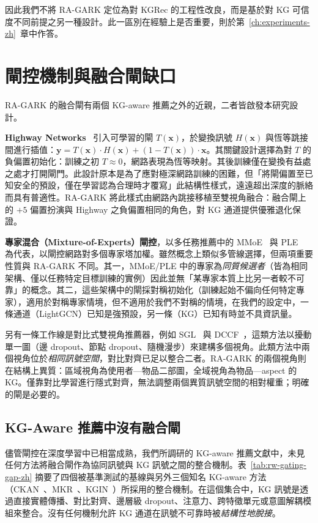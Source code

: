 因此我們不將 RA-GARK 定位為對 KGRec 的工程性改良，而是基於對 KG 可信度不同前提之另一種設計。此一區別在經驗上是否重要，則於第~\ref{ch:experiments-zh}~章中作答。

\section{閘控機制與融合閘缺口}
\label{sec:rw-gating-zh}

RA-GARK 的融合閘有兩個 KG-aware 推薦之外的近親，二者皆啟發本研究設計。

\textbf{Highway Networks}~\cite{srivastava2015highway} 引入可學習的閘 $T(\mathbf{x})$，於變換訊號 $H(\mathbf{x})$ 與恆等跳接間進行插值：$\mathbf{y} = T(\mathbf{x}) \cdot H(\mathbf{x}) + (1 - T(\mathbf{x})) \cdot \mathbf{x}$。其關鍵設計選擇為對 $T$ 的負偏置初始化：訓練之初 $T \approx 0$，網路表現為恆等映射。其後訓練僅在變換有益處之處才打開閘門。此設計原本是為了應對極深網路訓練的困難，但「將閘偏置至已知安全的預設，僅在學習認為合理時才覆寫」此結構性樣式，遠遠超出深度的脈絡而具有普適性。RA-GARK 將此樣式由網路內跳接移植至雙視角融合：融合閘上的 $+5$ 偏置扮演與 Highway 之負偏置相同的角色，對 KG 通道提供優雅退化保證。

\textbf{專家混合（Mixture-of-Experts）閘控}，以多任務推薦中的 MMoE~\cite{ma2018mmoe} 與 PLE~\cite{tang2020ple} 為代表，以閘控網路對多個專家塔加權。雖然概念上類似多管線選擇，但兩項重要性質與 RA-GARK 不同。其一，MMoE/PLE 中的專家為\emph{同質候選者}（皆為相同架構、僅以任務特定目標訓練的實例）因此並無「某專家本質上比另一者較不可靠」的概念。其二，這些架構中的閘採對稱初始化（訓練起始不偏向任何特定專家），適用於對稱專家情境，但不適用於我們不對稱的情境，在我們的設定中，一條通道（LightGCN）已知是強預設，另一條（KG）已知有時並不具資訊量。

另有一條工作線是對比式雙視角推薦器，例如 SGL~\cite{wu2021sgl} 與 DCCF~\cite{ren2023dccf}，這類方法以擾動單一圖（邊 dropout、節點 dropout、隨機漫步）來建構多個視角。此類方法中兩個視角位於\emph{相同訊號空間}，對比對齊已足以整合二者。RA-GARK 的兩個視角則在結構上異質：區域視角為使用者—物品二部圖，全域視角為物品—aspect 的 KG。僅靠對比學習進行隱式對齊，無法調整兩個異質訊號空間的相對權重；明確的閘是必要的。

\subsection{KG-Aware 推薦中沒有融合閘}
\label{sec:rw-gating-gap-zh}

儘管閘控在深度學習中已相當成熟，我們所調研的 KG-aware 推薦文獻中，未見任何方法將融合閘作為協同訊號與 KG 訊號之間的整合機制。表~\ref{tab:rw-gating-gap-zh} 摘要了四個被基準測試的基線與另外三個知名 KG-aware 方法（CKAN~\cite{wang2020ckan}、MKR~\cite{wang2019mkr}、KGIN~\cite{wang2021kgin}）所採用的整合機制。在這個集合中，KG 訊號是透過直接實體傳播、對比對齊、邊層級 dropout、注意力、跨特徵單元或意圖解耦模組來整合。沒有任何機制允許 KG 通道在訊號不可靠時被\emph{結構性地脫接}。

